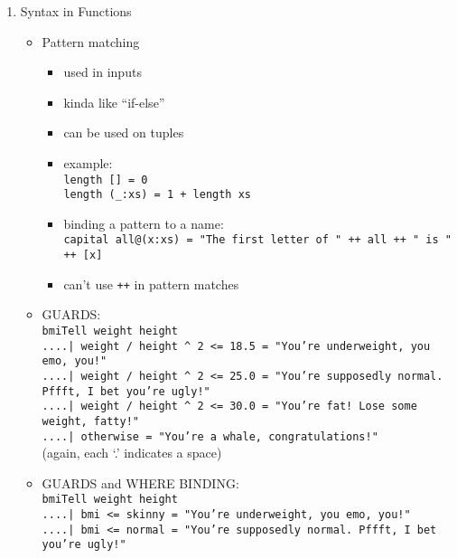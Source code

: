 \documentclass[a4paper,10pt]{article}
\begin{document}
\begin{enumerate}
  \item Syntax in Functions
  \begin{itemize}
   \item Pattern matching
   \begin{itemize}
    \item used in inputs
    \item kinda like ``if-else''
    \item can be used on tuples
    \item example:
    \\\texttt{length\textquotesingle \ [] = 0}
    \\\texttt{length\textquotesingle \ (\_:xs) = 1 + length\textquotesingle \ xs}
    \item binding a pattern to a name:
    \\\texttt{capital all@(x:xs) = "The first letter of " ++ all ++ " is " ++ [x]}
    \item can't use \texttt{++} in pattern matches
   \end{itemize}
   \item GUARDS:
   \\\texttt{bmiTell weight height}
   \\\texttt{....| weight / height \^{} 2 <= 18.5 = "You're underweight, you emo, you!"}
   \\\texttt{....| weight / height \^{} 2 <= 25.0 = "You're supposedly normal. Pffft, I bet you're ugly!"}
   \\\texttt{....| weight / height \^{} 2 <= 30.0 = "You're fat! Lose some weight, fatty!"}
   \\\texttt{....| otherwise = "You're a whale, congratulations!"}
   \\(again, each `.' indicates a space)
   \item GUARDS and WHERE BINDING:
   \\\texttt{bmiTell weight height}
   \\\texttt{....| bmi <= skinny = "You're underweight, you emo, you!"}
   \\\texttt{....| bmi <= normal = "You're supposedly normal. Pffft, I bet you're ugly!"}

\end{itemize}
\end{enumerate}
\end{document}
